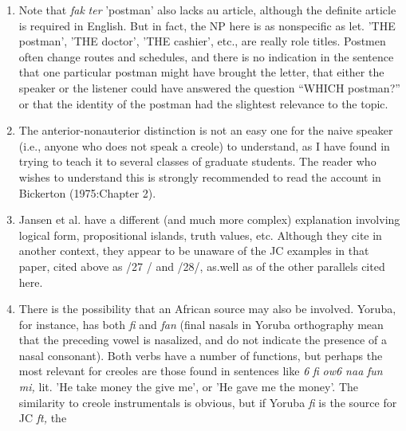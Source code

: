 \begin{enumerate}
\item Note that \textit{fak} \textit{ter} 'postman' also lacks au article, although the 
definite article is required in English. But in fact, the NP here is as nonspecific as let. 'THE postman', 'THE doctor', 'THE cashier', etc., are really role titles. Postmen often change routes and schedules, and there is no indication in the sentence that one particular postman might have brought the letter, that either the speaker or the listener could have answered the question ``WHICH postman?'' or that the identity of the postman had the slightest relevance to the topic.
 
\item The anterior-nonauterior distinction is not an easy one for the naive speaker (i.e., anyone who does not speak a creole) to under\-stand, as I have found in trying to teach it to several classes of graduate students. The reader who wishes to understand this is strongly recom\-mended to read the account in Bickerton (1975:Chapter 2).
\item Jansen et al. have a different (and much more complex) explanation involving logical form, propositional islands, truth values, etc. Although they cite \citet{Roberts1975} in another context, they appear to be unaware of the JC examples in that paper, cited above as /27 / and 
/28/, as.well as of the other parallels cited here.
 
\item There is the possibility that an African source may also be involved. Yoruba, for instance, has both \textit{fi} and \textit{fan }(final nasals in 
Yoruba orthography mean that the preceding vowel is nasalized, and do not indicate the presence of a nasal consonant). Both verbs have a number of functions, but perhaps the most relevant for creoles are those found in sentences like \textit{6} \textit{fi} \textit{ow6 naa} \textit{fun} \textit{mi,} lit. 'He take money the give me', or 'He gave me the money'. The similarity to creole
instrumentals is obvious, but if Yoruba \textit{fi} is the source for JC \textit{ft,} the


\end{enumerate}
